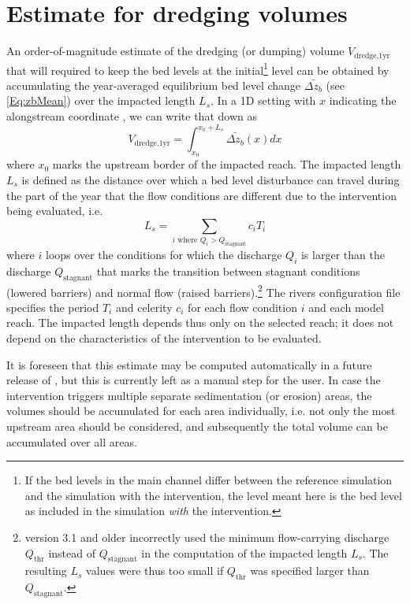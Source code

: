 \section{Estimate for dredging volumes}\label{Sec:DredgeVol}

An order-of-magnitude estimate of the dredging (or dumping) volume $V_\text{dredge,1yr}$ that will required to keep the bed levels at the initial\footnote{If the bed levels in the main channel differ between the reference simulation and the simulation with the intervention, the level meant here is the bed level as included in the simulation \emph{with} the intervention.} level can be obtained by accumulating the year-averaged equilibrium bed level change $\bar{\Delta z_b}$ (see \autoref{Eq:zbMean}) over the impacted length $L_s$.
In a 1D setting with $x$ indicating the alongstream coordinate , we can write that down as
%
\begin{equation}
V_\text{dredge,1yr} = \int_{x_0}^{x_0 + L_s} \bar{\Delta z_b}(x) dx
\end{equation}
%
where $x_0$ marks the upstream border of the impacted reach.
The impacted length $L_s$ is defined as the distance over which a bed level disturbance can travel during the part of the year that the flow conditions are different due to the intervention being evaluated, i.e.
%
\begin{equation}
L_s = \sum_{i \text{ where $Q_i > Q_\text{stagnant}$}} c_i T_i
\end{equation}
%
where $i$ loops over the conditions for which the discharge $Q_i$ is larger than the discharge $Q_\text{stagnant}$ that marks the transition between stagnant conditions (lowered barriers) and normal flow (raised barriers).\footnote{\dfmi version 3.1 and older incorrectly used the minimum flow-carrying discharge $Q_\text{thr}$ instead of $Q_\text{stagnant}$ in the computation of the impacted length $L_s$.
The resulting $L_s$ values were thus too small if $Q_\text{thr}$ was specified larger than $Q_\text{stagnant}$.}
The rivers configuration file specifies the period $T_i$ and celerity $c_i$ for each flow condition $i$ and each model reach.
The impacted length depends thus only on the selected reach; it does not depend on the characteristics of the intervention to be evaluated.

It is foreseen that this estimate may be computed automatically in a future release of \dfmi, but this is currently left as a manual step for the user.
In case the intervention triggers multiple separate sedimentation (or erosion) areas, the volumes should be accumulated for each area individually, i.e. not only the most upstream area should be considered, and subsequently the total volume can be accumulated over all areas.
